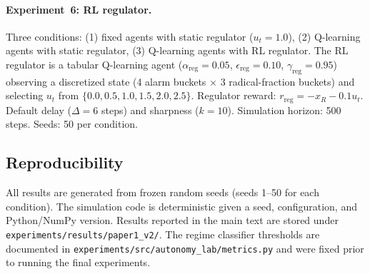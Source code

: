 \paragraph{Experiment~6: RL regulator.} Three conditions: (1) fixed agents with static regulator ($u_t=1.0$), (2) Q-learning agents with static regulator, (3) Q-learning agents with RL regulator. The RL regulator is a tabular Q-learning agent ($\alpha_{\mathrm{reg}}=0.05$, $\epsilon_{\mathrm{reg}}=0.10$, $\gamma_{\mathrm{reg}}=0.95$) observing a discretized state (4 alarm buckets $\times$ 3 radical-fraction buckets) and selecting $u_t$ from $\{0.0, 0.5, 1.0, 1.5, 2.0, 2.5\}$. Regulator reward: $r_{\mathrm{reg}} = -x_R - 0.1 u_t$. Default delay ($\Delta=6$ steps) and sharpness ($k=10$). Simulation horizon: 500 steps. Seeds: 50 per condition.

\subsection{Reproducibility}

All results are generated from frozen random seeds (seeds 1--50 for each condition). The simulation code is deterministic given a seed, configuration, and Python/NumPy version. Results reported in the main text are stored under \texttt{experiments/results/paper1\_v2/}. The regime classifier thresholds are documented in \texttt{experiments/src/autonomy\_lab/metrics.py} and were fixed prior to running the final experiments.
